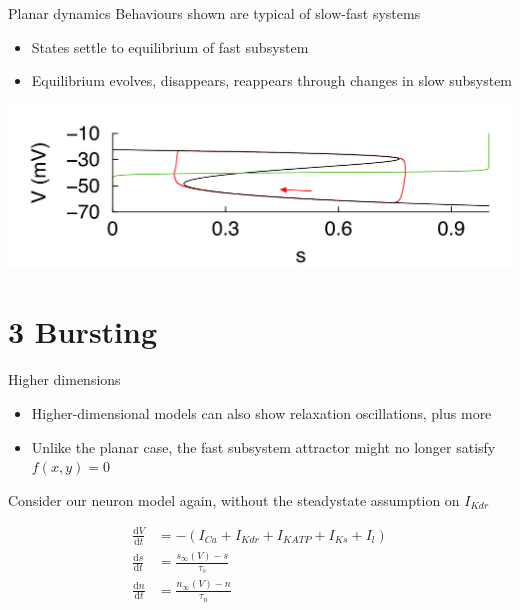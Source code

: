 \documentclass[presentation]{beamer}
\begin{document}
\begin{frame}[label={sec:orgca6256b}]{Planar dynamics}
Behaviours shown are typical of slow-fast systems
\begin{itemize}
\item States settle to equilibrium of fast subsystem
\item Equilibrium evolves, disappears, reappears through changes in slow subsystem
\end{itemize}

\begin{center}
\includegraphics[width=.9\linewidth]{./phaseplane.png}
\end{center}
\end{frame}

\section{3 Bursting}
\label{sec:org42980c5}
\begin{frame}[label={sec:org224f664}]{Higher dimensions}
\begin{itemize}
\item Higher-dimensional models can also show relaxation oscillations, plus more
\item Unlike the planar case, the fast subsystem attractor might no longer satisfy \(f(x,y)=0\)
\end{itemize}
\vfill
Consider our neuron model again, without the steadystate assumption on \(I_{Kdr}\)

\begin{align}
\frac{\mathrm{d}V}{\mathrm{d}t} &= -(I_{Ca} + I_{Kdr} + I_{KATP} + I_{Ks} + I_l) \\ \nonumber
\frac{\mathrm{d}s}{\mathrm{d}t} &= \frac{s_\infty(V) - s}{\tau_s} \\
\frac{\mathrm{d}n}{\mathrm{d}t} &= \frac{n_\infty(V) - n}{\tau_n} \nonumber
\end{align}
\end{frame}
\end{document}
